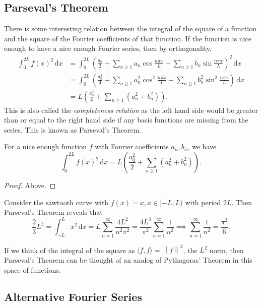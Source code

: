 \documentclass[a4paper]{article}
\begin{document}
\subsection{Parseval's Theorem}
There is some interesting relation between the integral of the square of a function and the square of the Fourier coefficients of that function.
If the function is nice enough to have a nice enough Fourier series, then by orthogonality,
\begin{align*}
    \int_0^{2L}f(x)^2\,\mathrm dx&=\int_0^{2L}\left( \frac{a_0}{2}+\sum_{n\ge 1}a_n\cos\frac{n\pi x}{L}+\sum_{n\ge 1}b_n\sin\frac{n\pi x}{L} \right)^2\,\mathrm dx\\
    &=\int_0^{2L}\left( \frac{a_0^2}{4}+\sum_{n\ge 1}a_n^2\cos^2\frac{n\pi x}{L}+\sum_{n\ge 1}b_n^2\sin^2\frac{n\pi x}{L} \right)\,\mathrm dx\\
    &=L\left( \frac{a_0^2}{2}+\sum_{n\ge 1}(a_n^2+b_n^2) \right).
\end{align*}
This is also called the \textit{completeness relation} as the left hand side would be greater than or equal to the right hand side if any basis functions are missing from the series.
This is known as Parseval's Theorem.
\begin{theorem}\label{parseval}
    For a nice enough function $f$ with Fourier coefficients $a_n,b_n$, we have
    \begin{equation}
        \int_0^{2L}f(x)^2\,\mathrm dx=L\left( \frac{a_0^2}{2}+\sum_{n\ge 1}(a_n^2+b_n^2) \right).
    \end{equation}
\end{theorem}
\begin{proof}
    Above.
\end{proof}
\begin{example}
    Consider the sawtooth curve with $f(x)=x,x\in[-L,L)$ with period $2L$.
    Then Parseval's Theorem reveals that
    $$\frac{2}{3}L^3=\int_{-L}^Lx^2\,\mathrm dx=L\sum_{n=1}^\infty\frac{4L^2}{n^2\pi^2}=\frac{4L^3}{\pi^2}\sum_{n=1}^\infty\frac{1}{n^2}\implies \sum_{n=1}^\infty\frac{1}{n^2}=\frac{\pi^2}{6}.$$
\end{example}
\begin{remark}
    If we think of the integral of the square as $ \langle f,f \rangle = \left\| f \right\| ^2  $, the $ L^2 $ norm, then Parseval's Theorem can be thought of an analog of Pythagoras' Theorem in this space of functions.
\end{remark}

\subsection{Alternative Fourier Series}
\end{document}
